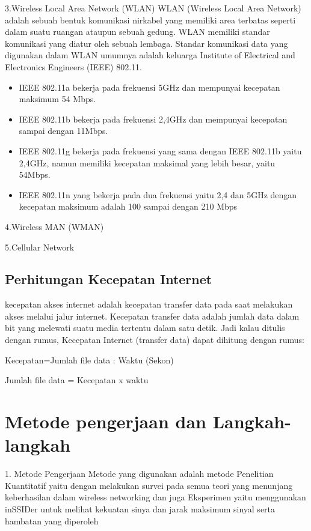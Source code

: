 \documentclass[conference]{IEEEtran}
\begin{document}
3.Wireless Local Area Network (WLAN)
WLAN (Wireless Local Area Network) adalah sebuah bentuk komunikasi nirkabel yang memiliki area terbatas seperti dalam suatu ruangan ataupun sebuah gedung. WLAN memiliki standar komunikasi yang diatur oleh sebuah lembaga. Standar komunikasi data yang digunakan dalam WLAN umumnya adalah keluarga Institute of Electrical and Electronics Engineers (IEEE) 802.11.
\begin{itemize}
    \item  IEEE 802.11a bekerja pada frekuensi 5GHz dan mempunyai kecepatan maksimum 54 Mbps.
    \item IEEE 802.11b bekerja pada frekuensi 2,4GHz dan mempunyai kecepatan sampai dengan 11Mbps.
    \item IEEE 802.11g bekerja pada frekuensi yang sama dengan IEEE 802.11b yaitu 2,4GHz, namun memiliki kecepatan maksimal yang lebih besar, yaitu 54Mbps.
    \item   IEEE 802.11n yang bekerja pada dua frekuensi yaitu 2,4 dan 5GHz dengan kecepatan maksimum adalah 100 sampai dengan 210 Mbps
\end{itemize}
\vspace{5pt}

4.Wireless MAN (WMAN)
\vspace{5pt}

5.Cellular Network
\subsection{Perhitungan Kecepatan Internet}
kecepatan akses internet adalah kecepatan transfer data pada saat melakukan akses melalui jalur internet. Kecepatan transfer data adalah jumlah data dalam bit yang melewati suatu media tertentu dalam satu detik.
Jadi kalau ditulis dengan rumus, Kecepatan Internet (transfer data) dapat dihitung dengan rumus:
\vspace{2pt}

Kecepatan=Jumlah file data : Waktu (Sekon)

Jumlah file data = Kecepatan x waktu

\section{Metode pengerjaan dan Langkah-langkah}
1. Metode Pengerjaan
Metode yang digunakan adalah metode Penelitian Kuantitatif yaitu dengan melakukan survei pada semua teori yang menunjang keberhasilan dalam wireless networking dan juga Eksperimen yaitu menggunakan inSSIDer untuk melihat kekuatan sinya dan jarak maksimum sinyal serta hambatan yang diperoleh
\vspace{4pt}
\end{document}
